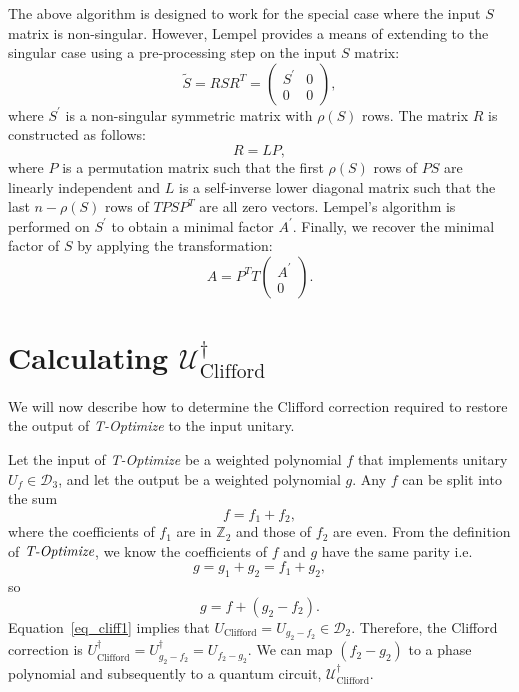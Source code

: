 \documentclass[notitlepage]{article}
\theoremstyle{definition}
\theoremstyle{problem}
\theoremstyle{lemma}
\begin{document}
	The above algorithm is designed to work for the special case where the input $S$ matrix is non-singular. However, Lempel provides a means of extending to the singular case using a pre-processing step on the input $S$ matrix:
	\begin{equation}
	\tilde{S} = RSR^T = \begin{pmatrix}
	S^\prime & 0 \\ 0 & 0
	\end{pmatrix},
	\end{equation}
	where $S^\prime$ is a non-singular symmetric matrix with $\rho(S)$ rows. The matrix $R$ is constructed as follows:
	\begin{equation}
	R = LP,
	\end{equation}
	where $P$ is a permutation matrix such that the first $\rho(S)$ rows of $PS$ are linearly independent and $L$ is a self-inverse lower diagonal matrix such that the last $n-\rho(S)$ rows of $TPSP^T$ are all zero vectors.
	Lempel's algorithm is performed on $S^\prime$ to obtain a minimal factor $A^\prime$. Finally, we recover the minimal factor of $S$ by applying the transformation:
	\begin{equation}
	A = P^TT\begin{pmatrix}
	A^\prime \\ 0
	\end{pmatrix}.
	\end{equation}
	
	\section{Calculating $\mathcal{U}_{\text{Clifford}}^\dagger$}
	\label{ap_Cliff}
	We will now describe how to determine the Clifford correction required to restore the output of \emph{T-Optimize} to the input unitary.
	
	Let the input of \emph{T-Optimize} be a weighted polynomial $f$ that implements unitary $U_f \in \mathcal{D}_3$, and let the output be a weighted polynomial $g$. Any $f$ can be split into the sum \begin{equation}
	f = f_1 + f_2,
	\end{equation}
	where the coefficients of $f_1$ are in $\mathbb{Z}_2$ and those of $f_2$ are even. From the definition of $\emph{T-Optimize}$, we know the coefficients of $f$ and $g$ have the same parity i.e.
	\begin{equation}
	g = g_1 + g_2 = f_1 + g_2,
	\end{equation}
	so
	\begin{equation}
	\label{eq_cliff1}
	g = f + (g_2 - f_2).
	\end{equation}
	Equation~\eqref{eq_cliff1} implies that $U_{\text{Clifford}} = U_{g_2 - f_2} \in \mathcal{D}_2$. Therefore, the Clifford correction is $U_{\text{Clifford}}^\dagger = U_{g_2 - f_2}^\dagger = U_{f_2-g_2}$. We can map $(f_2-g_2)$ to a phase polynomial and subsequently to a quantum circuit, $\mathcal{U}_{\text{Clifford}}^\dagger$.
\end{document}
